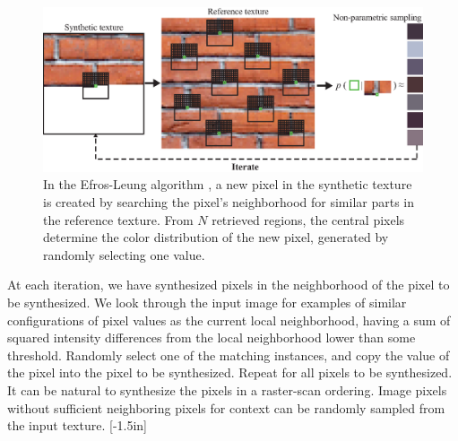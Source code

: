 {\begin{figure}
\centerline{
\includegraphics[width=1\linewidth]{figures/heeger_bergen/sampling_efros_leung.eps}
}
\caption{In the Efros-Leung algorithm \cite{Efros99}, a new pixel in the synthetic texture is created by searching the pixel's neighborhood for similar parts in the reference texture. From $N$ retrieved regions, the central pixels determine the color distribution of the new pixel, generated by randomly selecting one value.
}
\label{fig:sampling_efros_leung}
\end{figure}

At each iteration, we have synthesized pixels in the neighborhood of the pixel to be synthesized. We look through the input image for examples of similar configurations of pixel values as the current local neighborhood, having a sum of squared intensity differences from the local neighborhood lower than some threshold.  Randomly select one of the matching instances, and copy the value of the pixel into the pixel to be synthesized.  Repeat for all pixels to be synthesized.  It can be natural to synthesize the pixels in a raster-scan ordering.  Image pixels without sufficient neighboring pixels for context can be randomly sampled from the input texture.
[-1.5in]



}
